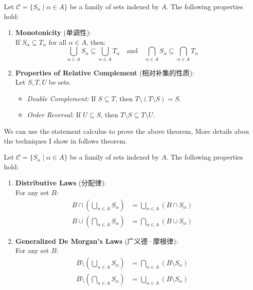 \documentclass[
	UTF-8,
	11pt, %
	a4paper, %
]{LegrandOrangeBook}
\begin{document}
\begin{theorem}
Let $\mathcal{C} = \{S_\alpha \mid \alpha \in A\}$ be a family of sets indexed by $A$. 
The following properties hold:

\begin{enumerate}
    \item \textbf{Monotonicity} (单调性): \\
    If $S_\alpha \subseteq T_\alpha$ for all $\alpha \in A$, then:
    \[ \bigcup_{\alpha \in A} S_\alpha \subseteq \bigcup_{\alpha \in A} T_\alpha \quad \text{and} \quad \bigcap_{\alpha \in A} S_\alpha \subseteq \bigcap_{\alpha \in A} T_\alpha \]

    \item \textbf{Properties of Relative Complement} (相对补集的性质): \\
    Let $S, T, U$ be sets.
    \begin{itemize}
        \item \textit{Double Complement:} If $S \subseteq T$, then $T \setminus (T \setminus S) = S$.
        \item \textit{Order Reversal:} If $U \subseteq S$, then $T \setminus S \subseteq T \setminus U$.
    \end{itemize}
	\end{enumerate}

\end{theorem}

We can use the statement calculus to prove the above theorem, More details abou the techniques I show in follows theorem.

\newpage

\begin{theorem}
	Let $\mathcal{C} = \{S_\alpha \mid \alpha \in A\}$ be a family of sets indexed by $A$. 
	The following properties hold:
	\begin{enumerate}

    \item \textbf{Distributive Laws} (分配律): \\
    For any set $B$:
    \begin{align*}
        B \cap \left( \bigcup_{\alpha \in A} S_\alpha \right) &= \bigcup_{\alpha \in A} (B \cap S_\alpha) \\
        B \cup \left( \bigcap_{\alpha \in A} S_\alpha \right) &= \bigcap_{\alpha \in A} (B \cup S_\alpha)
    \end{align*}

    \item \textbf{Generalized De Morgan's Laws} (广义德·摩根律): \\
    For any set $B$:
    \begin{align*}
        B \setminus \left( \bigcup_{\alpha \in A} S_\alpha \right) &= \bigcap_{\alpha \in A} (B \setminus S_\alpha) \\
        B \setminus \left( \bigcap_{\alpha \in A} S_\alpha \right) &= \bigcup_{\alpha \in A} (B \setminus S_\alpha)
    \end{align*}
\end{enumerate}
\end{theorem}
\end{document}
